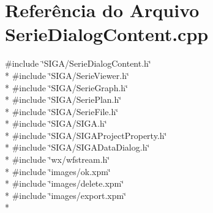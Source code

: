 \section{Referência do Arquivo Serie\+Dialog\+Content.\+cpp}
\label{_serie_dialog_content_8cpp}
{\ttfamily \#include \char`\"{}S\+I\+G\+A/\+Serie\+Dialog\+Content.\+h\char`\"{}}\\*
{\ttfamily \#include \char`\"{}S\+I\+G\+A/\+Serie\+Viewer.\+h\char`\"{}}\\*
{\ttfamily \#include \char`\"{}S\+I\+G\+A/\+Serie\+Graph.\+h\char`\"{}}\\*
{\ttfamily \#include \char`\"{}S\+I\+G\+A/\+Serie\+Plan.\+h\char`\"{}}\\*
{\ttfamily \#include \char`\"{}S\+I\+G\+A/\+Serie\+File.\+h\char`\"{}}\\*
{\ttfamily \#include \char`\"{}S\+I\+G\+A/\+S\+I\+G\+A.\+h\char`\"{}}\\*
{\ttfamily \#include \char`\"{}S\+I\+G\+A/\+S\+I\+G\+A\+Project\+Property.\+h\char`\"{}}\\*
{\ttfamily \#include \char`\"{}S\+I\+G\+A/\+S\+I\+G\+A\+Data\+Dialog.\+h\char`\"{}}\\*
{\ttfamily \#include \char`\"{}wx/wfstream.\+h\char`\"{}}\\*
{\ttfamily \#include \char`\"{}images/ok.\+xpm\char`\"{}}\\*
{\ttfamily \#include \char`\"{}images/delete.\+xpm\char`\"{}}\\*
{\ttfamily \#include \char`\"{}images/export.\+xpm\char`\"{}}\\*
